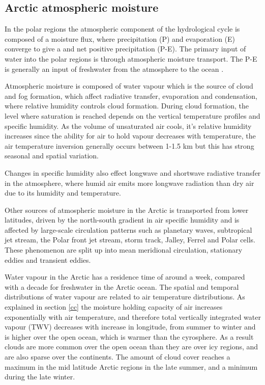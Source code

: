 \documentclass[12pt, oneside]{article}
\begin{document}
\subsection{Arctic atmospheric moisture }

In the polar regions the atmospheric component of the hydrological cycle is composed of a moisture flux, where precipitation (P) and evaporation (E) converge to give a and net positive precipitation (P-E). The primary input of water into the polar regions is through atmospheric moisture transport. The P-E is generally an input of freshwater from the atmosphere to the ocean \cite{oshima2017atmospheric}. 

Atmospheric moisture is composed of water vapour which is the source of cloud and fog formation, which affect radiative transfer, evaporation and condensation, where relative humidity controls cloud formation. During cloud formation, the level where saturation is reached depends on the vertical temperature profiles and specific humidity. As the volume of unsaturated air cools, it's relative humidity increases since the ability for air to hold vapour decreases with temperature, the air temperature inversion generally occurs between 1-1.5 km but this has strong seasonal and spatial variation. 

Changes in specific humidity also effect longwave and shortwave radiative transfer in the atmosphere, where humid air emits more longwave radiation than dry air due to its humidity and temperature. 


Other sources of atmospheric moisture in the Arctic is transported from lower latitudes, driven by the north-south gradient in air specific humidity and is affected by large-scale circulation patterns such as planetary waves, subtropical jet stream, the Polar front jet stream, storm track, Jalley, Ferrel and Polar cells. These phenomenon are split up into mean meridional circulation, stationary eddies and transient eddies. 

Water vapour in the Arctic has a residence time of around a week, compared with a decade for freshwater in the Arctic ocean. The spatial and temporal distributions of water vapour are related to air temperature distributions. As explained in section \ref{cc} the moisture holding capacity of air increases exponentially with air temperature, and therefore total vertically integrated water vapour (TWV) decreases with increase in longitude, from summer to winter and is higher over the open ocean, which is warmer than the cyrosphere. As a result clouds are more common over the open ocean than they are over icy regions, and are also sparse over the continents. The amount of cloud cover reaches a maximum in the mid latitude Arctic regions in the late summer, and a minimum during the late winter. 
\end{document}

